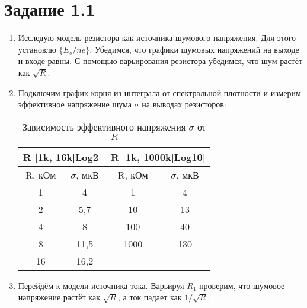 





\newpage 
\section*{Задание 1.1}

\begin{enumerate}
	\item Исследую модель резистора как источника шумового напряжения. Для этого установлю $\{E_s/ne\}$. Убедимся, что графики шумовых напряжений на выходе и входе равны. С помощью варьирования резистора убедимся, что шум растёт как $\sqrt{R}$.
	
	\item Подключим график корня из интеграла от спектральной плотности и измерим эффективное напряжение шума $\sigma$ на выводах резисторов: 
	
	\begin{table}[!h]
		\centering
		\begin{tabular}{|cc|cc|}
			\hline
			\multicolumn{2}{|c|}{R   {[}1k, 16k|Log2{]}} & \multicolumn{2}{c|}{R {[}1k, 1000k|Log10{]}} \\ \hline
			\multicolumn{1}{|c|}{R, кОм}   & $\sigma$, мкВ  & \multicolumn{1}{c|}{R, кОм}   & $\sigma$, мкВ   \\ \hline
			\multicolumn{1}{|c|}{1}        & 4           & \multicolumn{1}{c|}{1}        & 4            \\ \hline
			\multicolumn{1}{|c|}{2}        & 5,7         & \multicolumn{1}{c|}{10}       & 13           \\ \hline
			\multicolumn{1}{|c|}{4}        & 8           & \multicolumn{1}{c|}{100}      & 40           \\ \hline
			\multicolumn{1}{|c|}{8}        & 11,5        & \multicolumn{1}{c|}{1000}     & 130          \\ \hline
			\multicolumn{1}{|c|}{16}       & 16,2        &                               &              \\ \hline
		\end{tabular}
		\caption{Зависимость эффективного напряжения $\sigma$ от $R$}
		\label{tab:table_1}
	\end{table}

	\item Перейдём к модели источника тока. Варьируя $R_1$ проверим, что шумовое напряжение растёт как $\sqrt{R}$, а ток падает как $1/\sqrt{R}$:
	

\end{enumerate}
